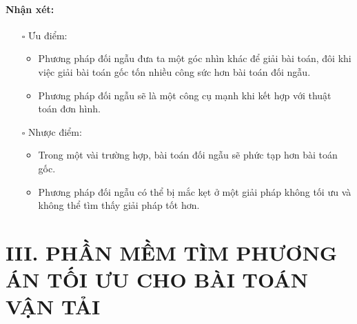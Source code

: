 \documentclass{article}
\begin{document}
\paragraph{Nhận xét:}
\begin{itemize}
    \item [$\square$] Ưu điểm:
    \begin{itemize}
        \item Phương pháp đối ngẫu đưa ta một góc nhìn khác để giải bài toán, đôi khi việc giải bài toán gốc tốn nhiều công sức hơn bài toán đối ngẫu.
        \item Phương pháp đối ngẫu sẽ là một công cụ mạnh khi kết hợp với thuật toán đơn hình.
    \end{itemize}
    \item [$\square$] Nhược điểm:
    \begin{itemize}
        \item Trong một vài trường hợp, bài toán đối ngẫu sẽ phức tạp hơn bài toán gốc.
        \item Phương pháp đối ngẫu có thể bị mắc kẹt ở một giải pháp không tối ưu và không thể tìm thấy giải pháp tốt hơn.
    \end{itemize}
\end{itemize}
\newpage
{}
\section*{III. PHẦN MỀM TÌM PHƯƠNG ÁN TỐI ƯU CHO BÀI TOÁN VẬN TẢI}
\setcounter{section}{1}\setlength{\baselineskip}{15pt}
\setcounter{subsection}{0}
\setcounter{subsubsection}{0}
\setcounter{paragraph}{0}
\end{document}
